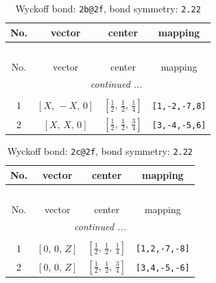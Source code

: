 \documentclass[fleqn,8pt]{jsarticle}
\begin{document}
\renewcommand{\arraystretch}{1.2}
\begin{longtable}{cccc}
\caption{Wyckoff bond: {\tt 2b@2f}, bond symmetry: {\tt 2.22}}
 \\
 \hline \hline
No. & vector & center & mapping \\ \hline \endfirsthead

\multicolumn{3}{l}{\tablename\ \thetable{}} \\
 \hline \hline
No. & vector & center & mapping \\ \hline \endhead

 \hline \hline
\multicolumn{3}{r}{\footnotesize\it continued ...} \\ \endfoot

 \hline \hline
\multicolumn{3}{r}{} \\ \endlastfoot

1 & $\left[ X,\, - X,\, 0 \right]$ & $\left[ \frac{1}{2},\, \frac{1}{2},\, \frac{1}{4} \right]$ & {\tt [1,-2,-7,8]} \\ \hline
2 & $\left[ X,\, X,\, 0 \right]$ & $\left[ \frac{1}{2},\, \frac{1}{2},\, \frac{3}{4} \right]$ & {\tt [3,-4,-5,6]} \\
\end{longtable}
\renewcommand{\arraystretch}{1.2}
\begin{longtable}{cccc}
\caption{Wyckoff bond: {\tt 2c@2f}, bond symmetry: {\tt 2.22}}
 \\
 \hline \hline
No. & vector & center & mapping \\ \hline \endfirsthead

\multicolumn{3}{l}{\tablename\ \thetable{}} \\
 \hline \hline
No. & vector & center & mapping \\ \hline \endhead

 \hline \hline
\multicolumn{3}{r}{\footnotesize\it continued ...} \\ \endfoot

 \hline \hline
\multicolumn{3}{r}{} \\ \endlastfoot

1 & $\left[ 0,\, 0,\, Z \right]$ & $\left[ \frac{1}{2},\, \frac{1}{2},\, \frac{1}{4} \right]$ & {\tt [1,2,-7,-8]} \\ \hline
2 & $\left[ 0,\, 0,\, Z \right]$ & $\left[ \frac{1}{2},\, \frac{1}{2},\, \frac{3}{4} \right]$ & {\tt [3,4,-5,-6]} \\
\end{longtable}
\renewcommand{\arraystretch}{1.2}
\end{document}
